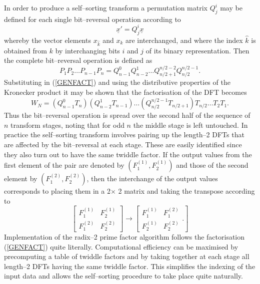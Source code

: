 \documentclass[dvips]{article}
\begin{document}
In order to produce a self--sorting transform a permutation matrix $Q_{j}^{i}$
may be defined for each single bit--reversal operation according to
\[
\underline{x}' = Q_{j}^{i}\underline{x}
\]
whereby the vector elements $x_{\hat{k}}$ and $x_{k}$ are interchanged,
and where the index $\hat{k}$ is obtained from $k$ by interchanging
bits $i$ and $j$ of its binary representation. 
Then the complete bit--reversal operation is defined as
\[
P_{1}P_{2}\ldots P_{n-1}P_{n} = Q_{n-1}^{0}Q_{n-2}^{1}\ldots
Q_{n/2+1}^{n/2-2}Q_{n/2}^{n/2-1}.
\]
Substituting in (\ref{GENFACT}) and using the distributive properties of
the Kronecker product it may be shown \cite{temper1} that the factorisation
of the DFT becomes
\[
W_{N} = \left(Q_{n-1}^{0}T_{n}\right)\left(Q_{n-2}^{1}T_{n-1}\right)\ldots
\left(Q_{n/2}^{n/2-1}T_{n/2+1}\right)T_{n/2}\ldots T_{2}T_{1}.
\]
Thus the bit--reversal operation is spread over the second half
of the sequence of $n$ transform stages, noting that for odd $n$
the middle stage is left untouched.  In practice the
self--sorting transform involves pairing up the length--2 DFTs that are
affected by the bit--reversal at each stage.  These are easily identified
since they also turn out to have the same twiddle factor.  If the output
values from the first element of the pair are denoted by
$(F^{(1)}_{1},F^{(1)}_{2})$ and those of the second element by
$(F^{(2)}_{1},F^{(2)}_{2})$, then the 
interchange of the output values corresponds to placing them in a 
2$\times$ 2 matrix and taking the transpose according to
\[
\left[
\begin{array}{cc} %
F^{(1)}_{1} & F^{(1)}_{2}  \\
F^{(2)}_{1} & F^{(2)}_{2}
\end{array}
\right]
\rightarrow
\left[
\begin{array}{cc} %
F^{(1)}_{1} & F^{(2)}_{1}  \\
F^{(1)}_{2} & F^{(2)}_{2}
\end{array}.
\right]
\]
Implementation of the radix--2 prime factor algorithm follows the factorisation
(\ref{GENFACT}) quite literally.  Computational efficiency can be maximised by 
precomputing a table of twiddle factors and by taking together at each
stage all length--2 DFTs having the same twiddle factor.  This simplifies
the indexing of the input data and allows the self--sorting procedure to
take place quite naturally.
\end{document}

